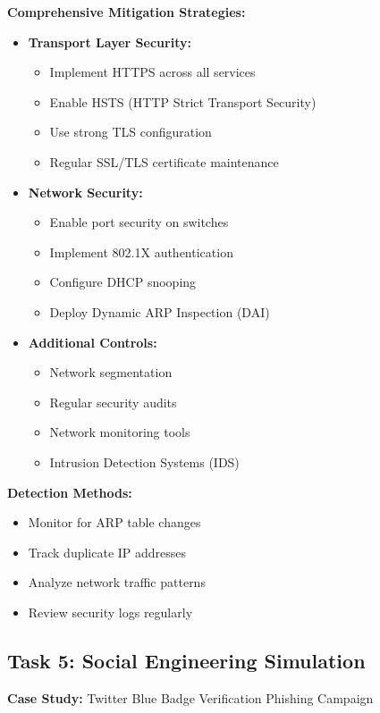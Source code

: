 \documentclass[12pt]{article}
\begin{document}
\textbf{Comprehensive Mitigation Strategies:}
\begin{itemize}
  \item \textbf{Transport Layer Security:}
    \begin{itemize}
      \item Implement HTTPS across all services
      \item Enable HSTS (HTTP Strict Transport Security)
      \item Use strong TLS configuration
      \item Regular SSL/TLS certificate maintenance
    \end{itemize}
  \item \textbf{Network Security:}
    \begin{itemize}
      \item Enable port security on switches
      \item Implement 802.1X authentication
      \item Configure DHCP snooping
      \item Deploy Dynamic ARP Inspection (DAI)
    \end{itemize}
  \item \textbf{Additional Controls:}
    \begin{itemize}
      \item Network segmentation
      \item Regular security audits
      \item Network monitoring tools
      \item Intrusion Detection Systems (IDS)
    \end{itemize}
\end{itemize}

\textbf{Detection Methods:}
\begin{itemize}
  \item Monitor for ARP table changes
  \item Track duplicate IP addresses
  \item Analyze network traffic patterns
  \item Review security logs regularly
\end{itemize}

\subsection*{Task 5: Social Engineering Simulation}
\textbf{Case Study:} Twitter Blue Badge Verification Phishing Campaign
\end{document}
